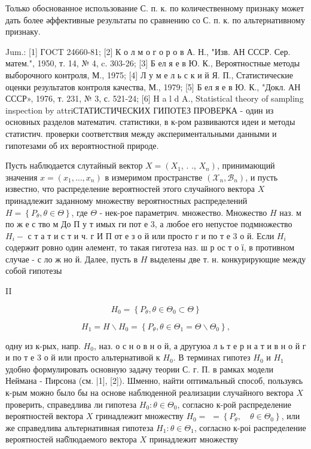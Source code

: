 \documentclass[10pt]{article}
\begin{document}
Только обоснованное использование С. п. к. по количественному признаку может дать более әффективные результаты по сравнению со С. п. к. по альтернативному признаку.



Jum.: [1] ГOCT 24660-81; [2] К о л м о г о р о в А. Н., "Изв. АН СССР. Сер. матем.", 1950, т. 14, № 4, c. 303-26; [3] Б ел я е в Ю. К., Вероятностные методы выборочного контроля, М., 1975; [4] Л у м е л ь с к и й Я. П., Статистические оценки результатов контроля качества, М., 1979; [5] Б ел я е в Ю. К., "Докл. АН СССР», 1976, т. 231, № 3, с. 521-24; [6] H a l d A., Statistical theory of sampling inspection by attriСТАТИСТИЧЕСКИХ ГИПОТЕЗ ПРОВЕРКА - один из основных разделов математич. статистики, в к-ром развиваются идеи и методы статистич. проверки соответствия между әкспериментальными данными и гипотезами об их вероятностной природе.



Пусть наблюдается слутайный вектор $X=\left(X_{1}\right.$, . ., $\left.X_{n}\right)$, принимающий значения $x=\left(x_{1}, \ldots, x_{n}\right)$ в измеримом пространстве $\left(\mathscr{X}_{n}, \mathscr{B}_{n}\right)$, и пусть известно, что распределение вероятностей этого случайного вектора $X$ принадлежит заданному множеству вероятностных распределений $H=\left\{P_{\theta}, \theta \in \Theta\right\}$, где $\Theta$ - нек-рое параметрич. множество. Множество $H$ наз. м по ж е с тво м До П у т имых ги пот е 3, а любое его непустое подмножество $H_{i}-$ с т а т и с т и ч. г И П от е $з$ о й или просто г и по т е 3 о й. Если $H_{i}$ содержит ровно один әлемент, то такая гиготеза наз. ш р ос т о ї, в противном случае - с ло ж но й. Далее, пусть в $H$ выделены две т. н. конкурирующие между собой гипотезы



II



\[

H_{0}=\left\{P_{\theta}, \theta \in \Theta_{0} \subset \Theta\right\}

\]



\[

H_{1}=H \backslash H_{0}=\left\{P_{\theta}, \theta \in \Theta_{1}=\Theta \backslash \Theta_{0}\right\},

\]



одну из к-рых, напр. $H_{0}$, наз. о с н о в н о й, а другуюа л ь т е р н а т и в н о й г и по т е 3 о й или просто альтернативой к $H_{0}$. В терминах гипотез $H_{0}$ и $H_{1}$ удобно формулировать основную задачу теории С. г. П. в рамках модели Неймана - Пирсона (см. |1], [2]). Шменно, найти оптимальный способ, пользуясь к-рым можно было бы на основе наблюденной реализации случайного вектора $X$ проверить, справедлива ли гипотеза $H_{0}: \theta \in \Theta_{0}$, согласно к-рой распределение вероятностей вектора $X$ гринадлежит множеству $H_{0}=$ $=\left\{P_{\theta}, \quad \theta \in \Theta_{0}\right\}$, или же справедлива альтернативная гипотеза $H_{1}: \theta \in \Theta_{1}$, согласно к-роі распределение вероятностей наб̆людаемого вектора $X$ принадлежит множеству
\end{document}
